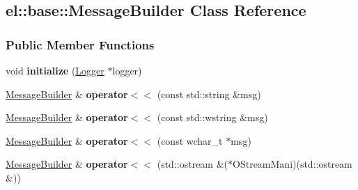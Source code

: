 \hypertarget{a00052}{}\subsection{el\+:\+:base\+:\+:Message\+Builder Class Reference}
\label{a00052}
\subsubsection*{Public Member Functions}
\begin{DoxyCompactItemize}
\item 
\hypertarget{a00052_a61729d9b620eb7b3e6ac1af69364553c}{}void {\bfseries initialize} (\hyperlink{a00048}{Logger} $\ast$logger)\label{a00052_a61729d9b620eb7b3e6ac1af69364553c}

\item 
\hypertarget{a00052_a740a968d7f2901d49a2e1c348cfea7bf}{}\hyperlink{a00052}{Message\+Builder} \& {\bfseries operator$<$$<$} (const std\+::string \&msg)\label{a00052_a740a968d7f2901d49a2e1c348cfea7bf}

\item 
\hypertarget{a00052_ad04c5d0a8fc38662ede9aaa742912a42}{}\hyperlink{a00052}{Message\+Builder} \& {\bfseries operator$<$$<$} (const std\+::wstring \&msg)\label{a00052_ad04c5d0a8fc38662ede9aaa742912a42}

\item 
\hypertarget{a00052_a42c2a21a6bebb2ad52d22da054cd8f49}{}\hyperlink{a00052}{Message\+Builder} \& {\bfseries operator$<$$<$} (const wchar\+\_\+t $\ast$msg)\label{a00052_a42c2a21a6bebb2ad52d22da054cd8f49}

\item 
\hypertarget{a00052_a884b9fd5f742f5fa25bbc78d3415a674}{}\hyperlink{a00052}{Message\+Builder} \& {\bfseries operator$<$$<$} (std\+::ostream \&($\ast$O\+Stream\+Mani)(std\+::ostream \&))\label{a00052_a884b9fd5f742f5fa25bbc78d3415a674}

\end{DoxyCompactItemize}
